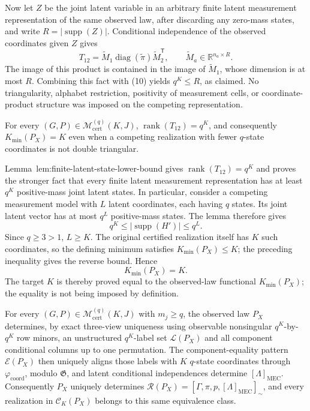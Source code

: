Now let \(Z\) be the joint latent variable in an arbitrary finite latent measurement representation of the same observed law, after discarding any zero-mass states, and write \(R=|\operatorname{supp}(Z)|\).  Conditional independence of the observed coordinates given \(Z\) gives
\[
 T_{12}=\widetilde M_1\operatorname{diag}(\widetilde\pi)
 \widetilde M_2^{\mathsf T},
 \qquad
 \widetilde M_a\in\mathbb R^{n_a\times R}.
\]
The image of this product is contained in the image of \(\widetilde M_1\), whose dimension is at most \(R\).  Combining this fact with (10) yields \(q^K\le R\), as claimed.  No triangularity, alphabet restriction, positivity of measurement cells, or coordinate-product structure was imposed on the competing representation.

For every \((G,P)\in\mathcal M_{\mathrm{cert}}^{(q)}(K,J)\), \(\operatorname{rank}(T_{12})=q^K\), and consequently \(K_{\min}(P_X)=K\) even when a competing realization with fewer \(q\)-state coordinates is not double triangular.

Lemma~\textnormal{lem:finite-latent-state-lower-bound} gives \(\operatorname{rank}(T_{12})=q^K\) and proves the stronger fact that every finite latent measurement representation has at least \(q^K\) positive-mass joint latent states.  In particular, consider a competing measurement model with \(L\) latent coordinates, each having \(q\) states.  Its joint latent vector has at most \(q^L\) positive-mass states.  The lemma therefore gives
\[
 q^K\le |\operatorname{supp}(H')|\le q^L.
\]
Since \(q\ge3>1\), \(L\ge K\).  The original certified realization itself has \(K\) such coordinates, so the defining minimum satisfies \(K_{\min}(P_X)\le K\); the preceding inequality gives the reverse bound.  Hence
\[
 K_{\min}(P_X)=K.
\]
The target \(K\) is thereby proved equal to the observed-law functional \(K_{\min}(P_X)\); the equality is not being imposed by definition.

For every \((G,P)\in\mathcal M_{\mathrm{cert}}^{(q)}(K,J)\) with \(m_j\ge q\), the observed law \(P_X\) determines, by exact three-view uniqueness using observable nonsingular \(q^K\)-by-\(q^K\) row minors, an unstructured \(q^K\)-label set \(\mathscr L(P_X)\) and all component conditional columns up to one permutation.  The component-equality pattern \(\mathcal E(P_X)\) then uniquely aligns those labels with \(K\) \(q\)-state coordinates through \(\varphi_{\mathrm{coord}}\), modulo \(\mathfrak G\), and latent conditional independences determine \([\Lambda]_{\mathrm{MEC}}\).  Consequently \(P_X\) uniquely determines \(\mathcal R(P_X)=[\Gamma,\pi,p,[\Lambda]_{\mathrm{MEC}}]_{\sim}\), and every realization in \(\mathcal C_K(P_X)\) belongs to this same equivalence class.

